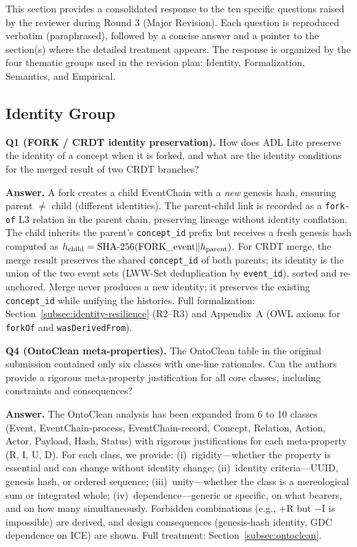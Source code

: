 
This section provides a consolidated response to the ten specific questions raised by the reviewer during Round 3 (Major Revision). Each question is reproduced verbatim (paraphrased), followed by a concise answer and a pointer to the section(s) where the detailed treatment appears. The response is organized by the four thematic groups used in the revision plan: Identity, Formalization, Semantics, and Empirical.

\subsection{Identity Group}\label{subsec:response-identity}

\textbf{Q1 (FORK / CRDT identity preservation).} How does ADL Lite preserve the identity of a concept when it is forked, and what are the identity conditions for the merged result of two CRDT branches?

\textbf{Answer.} A fork creates a child EventChain with a \emph{new} genesis hash, ensuring parent $\neq$ child (different identities). The parent-child link is recorded as a \texttt{fork-of} L3 relation in the parent chain, preserving lineage without identity conflation. The child inherits the parent's \texttt{concept\_id} prefix but receives a fresh genesis hash computed as $h_{\text{child}} = \text{SHA\text{-}256}(\text{FORK\_event} \| h_{\text{parent}})$. For CRDT merge, the merge result preserves the shared \texttt{concept\_id} of both parents; its identity is the union of the two event sets (LWW-Set deduplication by \texttt{event\_id}), sorted and re-anchored. Merge never produces a new identity; it preserves the existing \texttt{concept\_id} while unifying the histories. Full formalization: Section~\ref{subsec:identity-resilience} (R2--R3) and Appendix~A (OWL axioms for \texttt{forkOf} and \texttt{wasDerivedFrom}).

\textbf{Q4 (OntoClean meta-properties).} The OntoClean table in the original submission contained only six classes with one-line rationales. Can the authors provide a rigorous meta-property justification for all core classes, including constraints and consequences?

\textbf{Answer.} The OntoClean analysis has been expanded from 6 to 10 classes (Event, EventChain-process, EventChain-record, Concept, Relation, Action, Actor, Payload, Hash, Status) with rigorous justifications for each meta-property (R, I, U, D). For each class, we provide: (i)~rigidity---whether the property is essential and can change without identity change; (ii)~identity criteria---UUID, genesis hash, or ordered sequence; (iii)~unity---whether the class is a mereological sum or integrated whole; (iv)~dependence---generic or specific, on what bearers, and on how many simultaneously. Forbidden combinations (e.g., +R but $-$I is impossible) are derived, and design consequences (genesis-hash identity, GDC dependence on ICE) are shown. Full treatment: Section~\ref{subsec:ontoclean}.

